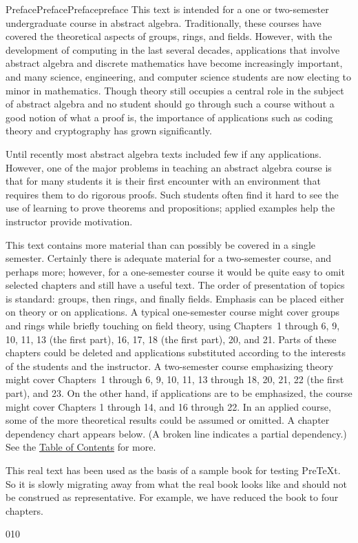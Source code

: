 \documentclass[oneside,10pt,]{book}
\numberwithin{equation}{section}
\begin{document}
\begin{preface}{Preface}{Preface}{}{Preface}{}{}{preface}
This text is intended for a one or two-semester undergraduate course in  abstract algebra. Traditionally, these courses have covered the theoretical aspects of groups, rings, and fields.  However, with the development of computing in the last several decades, applications that involve abstract algebra and discrete mathematics have become increasingly important, and many science, engineering, and computer science students are now electing to minor in mathematics. Though theory still occupies a central role in the subject of abstract algebra and no student should go through such a course without a good notion of what a proof is, the importance of applications such as coding theory and cryptography has grown significantly.%
\par
Until recently most abstract algebra texts included few if any applications. However, one of the major problems in teaching an abstract algebra course is that for many students it is their first encounter with an environment that requires them to do rigorous proofs. Such students often find it hard to see the use of learning to prove theorems and propositions; applied examples help the instructor provide motivation.%
\par
This text contains more material than can possibly be covered in a single semester.  Certainly there is adequate material for a two-semester course, and perhaps more; however, for a one-semester course it would be quite easy to omit selected chapters and still have a useful text.  The order of presentation of topics is standard: groups, then rings, and finally fields. Emphasis can be placed either on theory or on applications. A typical one-semester course might cover groups and rings while briefly touching on field theory, using Chapters~1 through 6, 9, 10, 11, 13 (the first part), 16, 17, 18 (the first part), 20, and 21. Parts of these chapters could be deleted and applications substituted according to the interests of the students and the instructor. A two-semester course emphasizing theory might cover Chapters~1 through 6, 9, 10, 11, 13 through 18, 20, 21, 22 (the first part), and 23. On the other hand, if applications are to be emphasized, the course might cover Chapters 1 through 14, and 16 through 22. In an applied course, some of the more theoretical results could be assumed or omitted. A chapter dependency chart appears below. (A broken line indicates a partial dependency.)  See the \hyperlink{sample-book}{Table of Contents} for more.%
\par
This real text has been used as the basis of a sample book for testing PreTeXt.  So it is slowly migrating away from what the real book looks like and should not be construed as representative.  For example, we have reduced the book to four chapters.%
\begin{image}{0}{1}{0}{}%
\resizebox{\linewidth}{!}{%
\begin{tikzpicture}[scale=0.8]


\end{tikzpicture}}
\end{image}
\end{preface}
\end{document}

